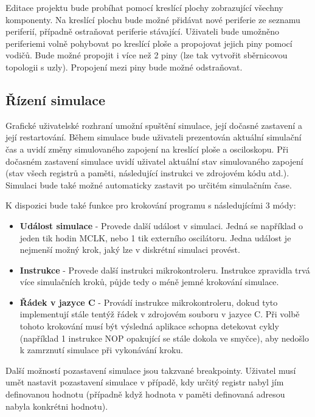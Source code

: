 Editace projektu bude probíhat pomocí kreslící plochy zobrazující všechny komponenty. Na kreslící plochu bude možné přidávat nové periferie ze seznamu periferií, případně ostraňovat periferie stávající. Uživateli bude umožněno periferiemi volně pohybovat po kreslící ploše a propojovat jejich piny pomocí vodičů. Bude možné propojit i více než 2 piny (lze tak vytvořit sběrnicovou topologii s uzly). Propojení mezi piny bude možné odstraňovat.

\subsection{Řízení simulace}

Grafické uživatelské rozhraní umožní spuštění simulace, její dočasné zastavení a její restartování. Během simulace bude uživateli prezentován aktuální simulační čas a uvidí změny simulovaného zapojení na kreslící ploše a osciloskopu. Při dočasném zastavení simulace uvidí uživatel aktuální
stav simulovaného zapojení (stav všech registrů a paměti, následující instrukci ve zdrojovém kódu atd.). Simulaci bude také možné automaticky zastavit po určitém simulačním čase.

K dispozici bude také funkce pro krokování programu s následujícími 3 módy:

\begin{itemize}
\item \textbf{Událost simulace} - Provede další událost v simulaci. Jedná se například o jeden tik hodin MCLK, nebo 1 tik externího oscilátoru. Jedna událost je nejmenší možný krok, jaký lze v diskrétní simulaci provést.
\item \textbf{Instrukce} - Provede další instrukci mikrokontroleru. Instrukce zpravidla trvá více simulačních kroků, půjde tedy o méně jemné krokování simulace.
\item \textbf{Řádek v jazyce C} - Provádí instrukce mikrokontroleru, dokud tyto implementují stále tentýž řádek v zdrojovém souboru v jazyce C. Při volbě tohoto krokování musí být výsledná aplikace schopna detekovat cykly (například 1 instrukce NOP opakující se stále dokola ve smyčce), aby nedošlo k zamrznutí simulace při vykonávání kroku.
\end{itemize}

Další možností pozastavení simulace jsou takzvané breakpointy. Uživatel musí umět nastavit pozastavení simulace v případě, kdy určitý registr nabyl jím definovanou hodnotu (případně když hodnota v paměti definovaná adresou nabyla konkrétni hodnotu).

